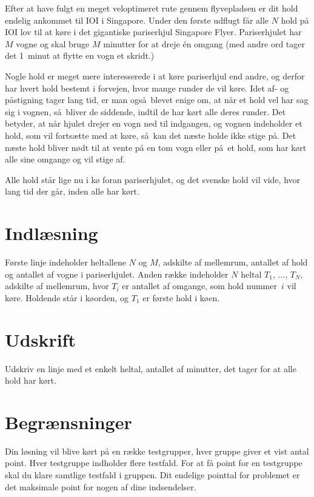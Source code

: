

Efter at have fulgt en meget veloptimeret rute gennem flyvepladsen er dit hold endelig ankommet til IOI i Singapore.
Under den første udflugt får alle $N$ hold på IOI lov til at køre i det gigantiske pariserhjul Singapore Flyer.
Pariserhjulet har $M$ vogne og skal bruge $M$ minutter for at dreje én omgang (med andre ord tager det 1~minut at flytte en vogn et skridt.)

Nogle hold er meget mere interesserede i at køre pariserhjul end andre, og derfor har hvert hold bestemt i forvejen, hvor mange runder de vil køre.
Idet af- og påstigning tager lang tid, er man også blevet enige om, at når et hold vel har sag sig i vognen, så bliver de siddende, indtil de har kørt alle deres runder.
Det betyder, at når hjulet drejer en vogn ned til indgangen, og vognen indeholder et hold, som vil fortsætte med at køre, så kan det næste holde ikke stige på.
Det næste hold bliver nødt til at vente på en tom vogn eller på et hold, som har kørt alle sine omgange og vil stige af.


Alle hold står lige nu i kø foran pariserhjulet, og det svenske hold vil vide, hvor lang tid der går, inden alle har kørt.

\section*{Indlæsning}
Første linje indeholder heltallene $N$ og $M$, adskilte af mellemrum, antallet af hold og antallet af vogne i pariserhjulet.
Anden række indeholder $N$ heltal $T_1$, $\ldots$, $T_N$, adskilte af mellemrum, hvor $T_i$ er antallet af omgange, som hold  nummer~$i$ vil køre.
Holdende står i køorden, og $T_1$ er første hold i køen.

\section*{Udskrift}
Udskriv en linje med et enkelt heltal, antallet af minutter, det tager for at alle hold har kørt.

\section*{Begrænsninger}
Din løsning vil blive kørt på en række testgrupper, hver gruppe giver et vist antal point.
Hver testgruppe indholder flere testfald.
For at få point for en testgruppe skal du klare samtlige testfald i gruppen.
Dit endelige pointtal for problemet er det maksimale point for nogen af dine indsendelser.

